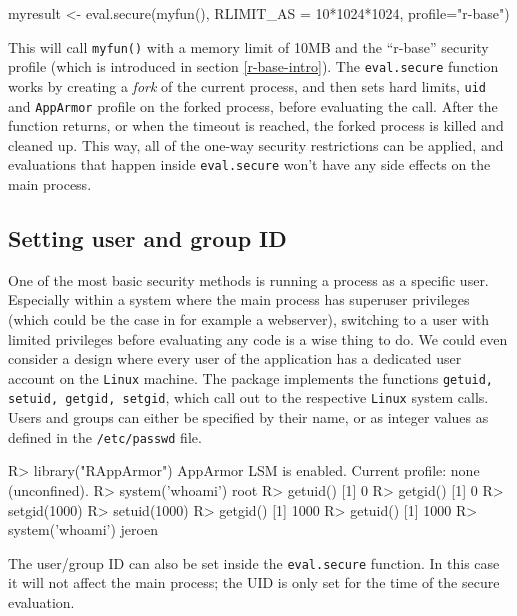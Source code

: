 \documentclass{jss}
\newcommand{\AppArmor}{\texttt{AppArmor}\xspace}
\newcommand{\RAppArmor}{\pkg{RAppArmor}\xspace}
\newcommand{\Linux}{\texttt{Linux}\xspace}
\begin{document}
\begin{CodeChunk}
\begin{CodeInput}
myresult <- eval.secure(myfun(), RLIMIT_AS = 10*1024*1024, profile="r-base")
\end{CodeInput}
\end{CodeChunk}

This will call \texttt{myfun()} with a memory limit of 10MB and the ``r-base''
security profile (which is introduced in section \ref{r-base-intro}). The
\texttt{eval.secure} function works by creating a \emph{fork} of the current
process, and then sets hard limits, \texttt{uid} and \AppArmor profile on the
forked process, before evaluating the call. After the function returns, or when the
timeout is reached, the forked process is killed and cleaned up. This way, all
of the one-way security restrictions can be applied, and evaluations that
happen inside \texttt{eval.secure} won't have any side effects on the main
process.

\subsection{Setting user and group ID}

One of the most basic security methods is running a process as a specific user.
Especially within a system where the main process has superuser privileges
(which could be the case in for example a webserver), switching to a user with
limited privileges before evaluating any code is a wise thing to do. We could
even consider a design where every user of the application has a dedicated
user account on the \Linux machine. The \RAppArmor package implements the
functions \texttt{getuid, setuid, getgid, setgid}, which call out to the
respective \Linux system calls. Users and groups can either be specified
by their name, or as integer values as defined in the \texttt{/etc/passwd} file.

\begin{CodeChunk}
\begin{CodeInput}
R> library("RAppArmor")
AppArmor LSM is enabled.
Current profile: none (unconfined).
R> system('whoami')
root
R> getuid()
[1] 0
R> getgid()
[1] 0
R> setgid(1000)
R> setuid(1000)
R> getgid()
[1] 1000
R> getuid()
[1] 1000
R> system('whoami')
jeroen
\end{CodeInput}
\end{CodeChunk}

The user/group ID can also be set inside the \texttt{eval.secure} function. In
this case it will not affect the main process; the UID is only set for the time
of the secure evaluation.
\end{document}
